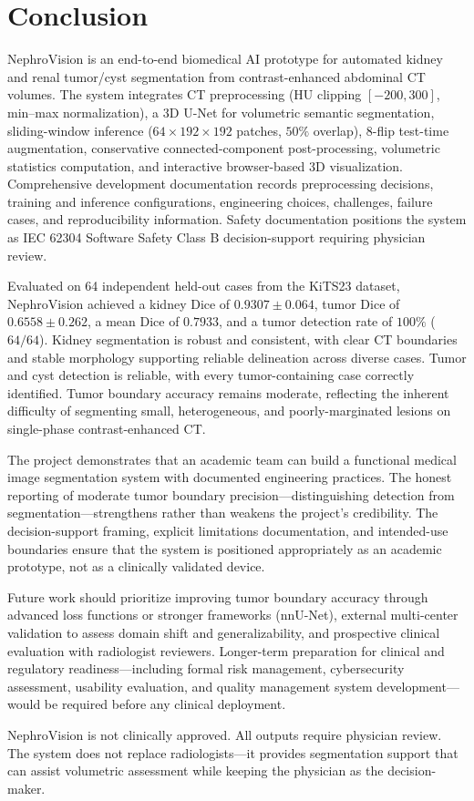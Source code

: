 \section{Conclusion}

NephroVision is an end-to-end biomedical AI prototype for automated kidney and renal tumor/cyst segmentation from contrast-enhanced abdominal CT volumes. The system integrates CT preprocessing (HU clipping $[-200, 300]$, min--max normalization), a 3D U-Net for volumetric semantic segmentation, sliding-window inference ($64 \times 192 \times 192$ patches, $50\%$ overlap), 8-flip test-time augmentation, conservative connected-component post-processing, volumetric statistics computation, and interactive browser-based 3D visualization. Comprehensive development documentation records preprocessing decisions, training and inference configurations, engineering choices, challenges, failure cases, and reproducibility information. Safety documentation positions the system as IEC 62304 Software Safety Class B decision-support requiring physician review.

Evaluated on 64 independent held-out cases from the KiTS23 dataset, NephroVision achieved a kidney Dice of $0.9307 \pm 0.064$, tumor Dice of $0.6558 \pm 0.262$, a mean Dice of $0.7933$, and a tumor detection rate of $100\%$ ($64/64$). Kidney segmentation is robust and consistent, with clear CT boundaries and stable morphology supporting reliable delineation across diverse cases. Tumor and cyst detection is reliable, with every tumor-containing case correctly identified. Tumor boundary accuracy remains moderate, reflecting the inherent difficulty of segmenting small, heterogeneous, and poorly-marginated lesions on single-phase contrast-enhanced CT.

The project demonstrates that an academic team can build a functional medical image segmentation system with documented engineering practices. The honest reporting of moderate tumor boundary precision---distinguishing detection from segmentation---strengthens rather than weakens the project's credibility. The decision-support framing, explicit limitations documentation, and intended-use boundaries ensure that the system is positioned appropriately as an academic prototype, not as a clinically validated device.

Future work should prioritize improving tumor boundary accuracy through advanced loss functions or stronger frameworks (nnU-Net), external multi-center validation to assess domain shift and generalizability, and prospective clinical evaluation with radiologist reviewers. Longer-term preparation for clinical and regulatory readiness---including formal risk management, cybersecurity assessment, usability evaluation, and quality management system development---would be required before any clinical deployment.

NephroVision is not clinically approved. All outputs require physician review. The system does not replace radiologists---it provides segmentation support that can assist volumetric assessment while keeping the physician as the decision-maker.
